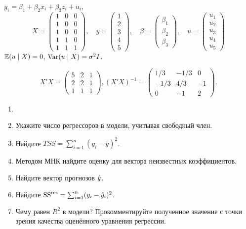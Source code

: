 \begin{problem}
  $y_i = \beta_1 + \beta_2 x_{i} + \beta_3 z_i + u_i$, 
\[
X = \begin{pmatrix} 
  1 & 0 & 0 \\ 
  1 & 0 & 0 \\ 
  1 & 0 & 0 \\ 
  1 & 1 & 0 \\ 
  1 & 1 & 1 
\end{pmatrix}, \quad
y = \begin{pmatrix} 1 \\ 2 \\ 3 \\ 4 \\ 5 \end{pmatrix}, \quad
\beta = \begin{pmatrix} \beta_1 \\ \beta_2 \\ \beta_3 \end{pmatrix}, \quad
u = \begin{pmatrix} u_1 \\ u_2 \\ u_3 \\ u_4 \\ u_5  \end{pmatrix}
\]
$\operatorname{\mathbb{E}}(u \mid X) = 0$, $\operatorname{Var}(u \mid X) = \sigma^2 I$. 


\[
X'X = \begin{pmatrix} 
  5 & 2 & 1 \\ 
  2 & 2 & 1\\ 
  1 & 1 & 1 
\end{pmatrix},
(X'X)^{-1}= \begin{pmatrix} 
  1/3 & -1/3 & 0 \\ 
  -1/3 & 4/3 & -1 \\ 
  0 & -1 & 2 \end{pmatrix}.
\]


\begin{enumerate}
\item {}
\item Укажите число регрессоров в модели, учитывая свободный член.
\item Найдите $TSS = \sum_{i=1}^n (y_i - \bar y)^2$.
\item Методом МНК найдите оценку для вектора неизвестных коэффициентов.
\item Найдите вектор прогнозов $\hat{y}$.
\item Найдите $\mathrm{SS}^{\text{res}} = \sum_{i=1}^n (y_i - \hat{y}_i)^2$.
\item Чему равен $R^2$ в модели? Прокомментируйте полученное значение с точки зрения качества оценённого уравнения регрессии.\end{enumerate}
\begin{sol}


\end{sol}
\end{problem}
